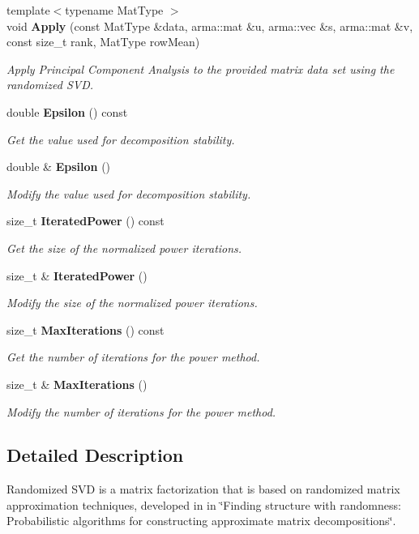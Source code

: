 \begin{DoxyCompactItemize}
{\footnotesize template$<$typename Mat\+Type $>$ }\\void \textbf{ Apply} (const Mat\+Type \&data, arma\+::mat \&u, arma\+::vec \&s, arma\+::mat \&v, const size\+\_\+t rank, Mat\+Type row\+Mean)
\begin{DoxyCompactList}\small\item\em Apply Principal Component Analysis to the provided matrix data set using the randomized S\+VD. \end{DoxyCompactList}\item 
double \textbf{ Epsilon} () const
\begin{DoxyCompactList}\small\item\em Get the value used for decomposition stability. \end{DoxyCompactList}\item 
double \& \textbf{ Epsilon} ()
\begin{DoxyCompactList}\small\item\em Modify the value used for decomposition stability. \end{DoxyCompactList}\item 
size\+\_\+t \textbf{ Iterated\+Power} () const
\begin{DoxyCompactList}\small\item\em Get the size of the normalized power iterations. \end{DoxyCompactList}\item 
size\+\_\+t \& \textbf{ Iterated\+Power} ()
\begin{DoxyCompactList}\small\item\em Modify the size of the normalized power iterations. \end{DoxyCompactList}\item 
size\+\_\+t \textbf{ Max\+Iterations} () const
\begin{DoxyCompactList}\small\item\em Get the number of iterations for the power method. \end{DoxyCompactList}\item 
size\+\_\+t \& \textbf{ Max\+Iterations} ()
\begin{DoxyCompactList}\small\item\em Modify the number of iterations for the power method. \end{DoxyCompactList}\end{DoxyCompactItemize}


\subsection{Detailed Description}
Randomized S\+VD is a matrix factorization that is based on randomized matrix approximation techniques, developed in in \char`\"{}\+Finding structure with randomness\+:
\+Probabilistic algorithms for constructing approximate matrix decompositions\char`\"{}. 

